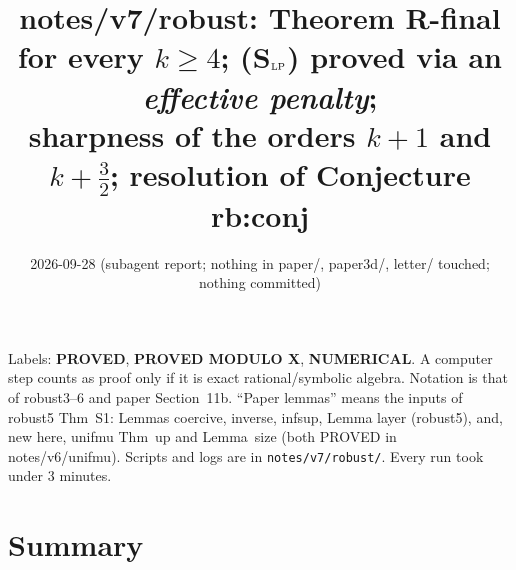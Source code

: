 \documentclass[11pt]{article}
\title{notes/v7/robust: Theorem R-final for every $k\ge4$; (S$_{\rm LP}$) proved via an \emph{effective penalty};\\
sharpness of the orders $k+1$ and $k+\tfrac32$; resolution of Conjecture rb:conj}
\date{2026-09-28 (subagent report; nothing in paper/, paper3d/, letter/ touched; nothing committed)}
\theoremstyle{remark}
\begin{document}
\maketitle

\noindent Labels: \textbf{PROVED}, \textbf{PROVED MODULO X}, \textbf{NUMERICAL}. A computer step counts as proof only if it is exact
rational/symbolic algebra. Notation is that of robust3--6 and paper Section~11b. ``Paper lemmas'' means the inputs of robust5 Thm~S1:
Lemmas coercive, inverse, infsup, Lemma layer (robust5), and, new here, unifmu Thm~up and Lemma~size (both PROVED in notes/v6/unifmu).
Scripts and logs are in \texttt{notes/v7/robust/}. Every run took under 3 minutes.

\section*{Summary}
\end{document}
